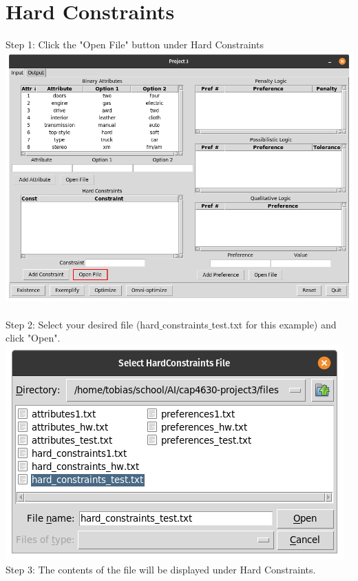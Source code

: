 \documentclass[12pt]{report}
\begin{document}
\section{Hard Constraints}
Step 1: Click the "Open File" button under Hard Constraints\\
\includegraphics[scale=0.3]{input_constraints} \\\\
Step 2: Select your desired file (hard$\_$constraints$\_$test.txt for this example) and click "Open".\\
\includegraphics[scale=0.3]{select_constraints}\\
Step 3: The contents of the file will be displayed under Hard Constraints.\\
\end{document}
